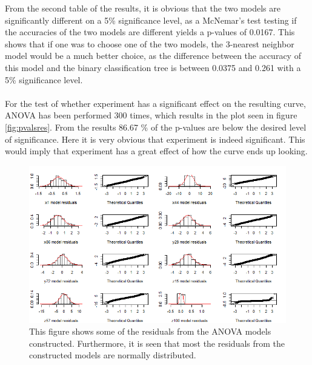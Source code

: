 \documentclass[11pt, fleqn, titlepage]{article}
\begin{document}
From the second table of the results, it is obvious that the two models are significantly different on a 5\% significance level, as a McNemar's test testing if the accuracies of the two models are different yields a p-values of 0.0167. This shows that if one was to choose one of the two models, the 3-nearest neighbor model would be a much better choice, as the difference between the accuracy of this model and the binary classification tree is between 0.0375 and 0.261 with a 5\% significance level. 
\\\\
For the test of whether experiment has a significant effect on the resulting curve, ANOVA has been performed 300 times, which results in the plot seen in figure \ref{fig:pvalsres}. From the results 86.67 \% of the p-values are below the desired level of significance. Here it is very obvious that experiment is indeed significant. This would imply that experiment has a great effect of how the curve ends up looking.
\begin{figure}[H]
	\centering
	\includegraphics[width=0.7\linewidth]{billeder/StadigNormalfordeltAF.png}
	\caption{This figure shows some of the residuals from the ANOVA models constructed. Furthermore, it is seen that most the residuals from the constructed models are normally distributed. }
	\label{fig:stadignormalfordeltaf}
\end{figure}
\end{document}
